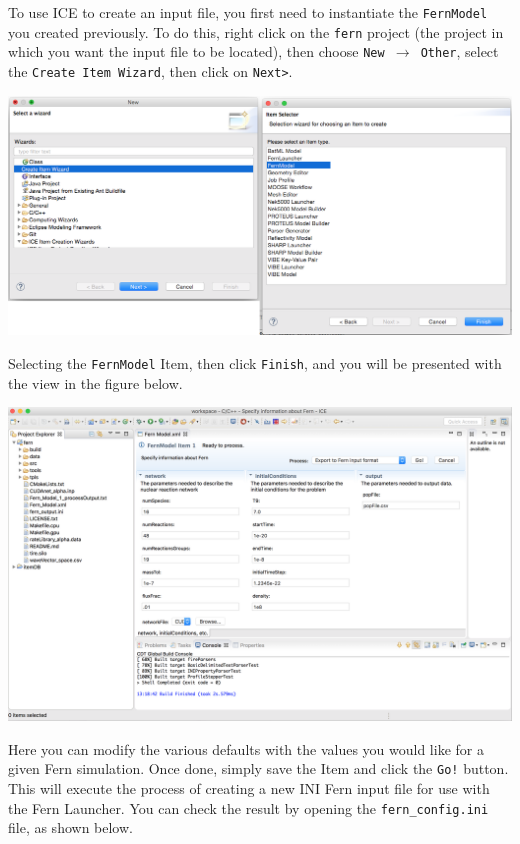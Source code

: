 To use ICE to create an input file, you first need to instantiate the
\texttt{FernModel} you created previously. To do this, right click on the
\texttt{fern} project (the project in which you want the input file to be
located), then choose \texttt{New $\rightarrow$ Other},  select the
\texttt{Create Item Wizard}, then click on \texttt{Next>}.
\begin{center} \includegraphics[width=\textwidth]{figures/creatingFernModelItem}
\end{center}
Selecting the \texttt{FernModel} Item, then click \texttt{Finish}, and you will
be presented with the view in the figure below. 
\begin{center} \includegraphics[width=\textwidth]{figures/fernmodelItem}
\end{center}
Here you can modify the various defaults with the values you would like for a
given Fern simulation. Once done, simply save the Item and click the
\texttt{Go!} button. This will execute the process of creating a new INI Fern
input file for use with the Fern Launcher. You can check the result by opening
the \texttt{fern\_config.ini} file, as shown below.
